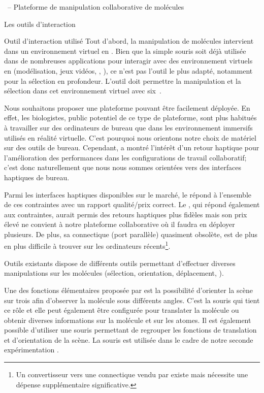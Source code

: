\documentclass[myfrancais,ngerman,english,frenchb]{mythesis}
\begin{document}
\begin{mychapter}{\myShaddock\ -- Plateforme de manipulation collaborative de molécules}
\begin{mysection}{Les outils d'interaction}
\begin{mysubsection}{Outil d'interaction utilisé}
				Tout d'abord, la manipulation de molécules intervient dans un environnement virtuel en \myThreeD.
				Bien que la simple souris soit déjà utilisée dans de nombreuses applications pour interagir avec des environnement virtuels en \myThreeD (modélisation, jeux vidéos, \myCAO, \myetc), ce n'est pas l'outil le plus adapté, notamment pour la sélection en profondeur.
				L'outil doit permettre la manipulation et la sélection dans cet environnement virtuel \myThreeD avec six~.

				Nous souhaitons proposer une plateforme pouvant être facilement déployée.
				En effet, les biologistes, public potentiel de ce type de plateforme, sont plus habitués à travailler sur des ordinateurs de bureau que dans les environnement immersifs utilisés en réalité virtuelle.
				C'est pourquoi nous orientons notre choix de matériel sur des outils de bureau.
				Cependant,  a montré l'intérêt d'un retour haptique pour l'amélioration des performances dans les configurations de travail collaboratif; c'est donc naturellement que nous nous sommes orientées vers des interfaces haptiques de bureau.

				Parmi les interfaces haptiques disponibles sur le marché, le \myOmni répond à l'ensemble de ces contraintes avec un rapport qualité/prix correct.
				Le \myDesktop, qui répond également aux contraintes, aurait permis des retours haptiques plus fidèles mais son prix élevé ne convient à notre plateforme collaborative où il faudra en déployer plusieurs.
				De plus, sa connectique (port parallèle) quasiment obsolète, est de plus en plus difficile à trouver sur les ordinateurs récents\footnote{Un convertisseur vers une connectique \myFireWire vendu par \mySensAble existe mais nécessite une dépense supplémentaire significative.}.
			\end{mysubsection}
			\begin{mysubsection}{Outils existants}
				 dispose de différents outils permettant d'effectuer diverses manipulations sur les molécules (sélection, orientation, déplacement, \myetc).

				Une des fonctions élémentaires proposée par  est la possibilité d'orienter la scène sur trois  afin d'observer la molécule sous différents angles.
				C'est la souris qui tient ce rôle et elle peut également être configurée pour translater la molécule ou obtenir diverses informations sur la molécule et sur les atomes.
				Il est également possible d'utiliser une souris \myThreeD permettant de regrouper les fonctions de translation et d'orientation de la scène.
				La souris \myThreeD \mySpaceNavigator est utilisée dans le cadre de notre seconde expérimentation .


\end{mysubsection}
\end{mysection}
\end{mychapter}
\end{document}

